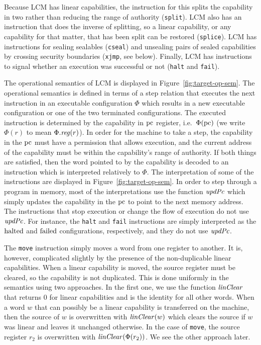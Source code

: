 \documentclass[acmsmall,review,anonymous]{acmart}\settopmatter{printfolios=true,printccs=false,printacmref=false}
\renewcommand{\updPcAddr}[1]{\plainfun{updPc}{#1}}
\renewcommand{\linCons}[1]{\plainfun{linClear}{#1}}
\newcommand{\trgcm}{\textsc{LCM}}
\begin{document}
Because \trgcm{} has linear capabilities, the instruction for this splits the capability in two rather than reducing the range of authority (\texttt{split}).
\trgcm{} also has an instruction that does the inverse of splitting, so a linear capability, or any capability for that matter, that has been split can be restored (\texttt{splice}).
\trgcm{} has instructions for sealing sealables (\texttt{cseal}) and unsealing pairs of sealed capabilities by crossing security boundaries (\texttt{xjmp}, see below).
Finally, \trgcm{} has instructions to signal whether an execution was successful or not (\texttt{halt} and \texttt{fail}).

The operational semantics of \trgcm{} is displayed in Figure~\ref{fig:target-op-sem}.
The operational semantics is defined in terms of a step relation that executes the next instruction in an executable configuration $\Phi$ which results in a new executable configuration or one of the two terminated configurations.
The executed instruction is determined by the capability in $\mathrm{pc}$ register, i.e.\ $\Phi(\mathrm{pc})$ (we write $\Phi(r)$ to mean $\Phi.\reg(r)$).
In order for the machine to take a step, the capability in the $\mathrm{pc}$ must have a permission that allows execution, and the current address of the capability must be within the capability's range of authority.
If both things are satisfied, then the word pointed to by the capability is decoded to an instruction which is interpreted relatively to $\Phi$.
The interpretation of some of the instructions are displayed in Figure~\ref{fig:target-op-sem}.
In order to step through a program in memory, most of the interpretations use the function $\updPcAddr{}$ which simply updates the capability in the $\mathrm{pc}$ to point to the next memory address.
The instructions that stop execution or change the flow of execution do not use $\updPcAddr{}$.
For instance, the \texttt{halt} and \texttt{fail} instructions are simply interpreted as the $\mathrm{halted}$ and $\mathrm{failed}$ configurations, respectively, and they do not use $\updPcAddr{}$.

The \texttt{move} instruction simply moves a word from one register to another.
It is, however, complicated slightly by the presence of the non-duplicable linear capabilities.
When a linear capability is moved, the source register must be cleared, so the capability is not duplicated.
This is done uniformly in the semantics using two approaches.
In the first one, we use the function $\linCons{}$ that returns $0$ for linear capabilities and is the identity for all other words.
When a word $w$ that can possibly be a linear capability is transferred on the machine, then the source of $w$ is overwritten with $\linCons{w}$ which clears the source if $w$ was linear and leaves it unchanged otherwise.
In the case of \texttt{move}, the source register $r_2$ is overwritten with $\linCons{\Phi(r_2)}$.
We see the other approach later.
\end{document}

